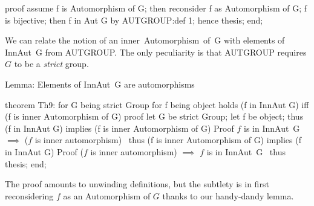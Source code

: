 \nwenddocs{}\endmoddef\nwstartdeflinemarkup{}\nwenddeflinemarkup
proof
  assume f is Automorphism of G;
  then reconsider f as Automorphism of G;
  f is bijective;
  then f in Aut G by AUTGROUP:def 1;
  hence thesis;
end;

\nwendcode{}\nwdocspar

We can relate the notion of an {\Tt{}inner\ Automorphism\ of\ G\nwendquote} with elements
of {\Tt{}InnAut\ G\nwendquote} from {\Tt{}AUTGROUP\nwendquote}. The only peculiarity is that
{\Tt{}AUTGROUP\nwendquote} requires $G$ to be a \emph{strict} group.

\nwenddocs{}\endmoddef\nwstartdeflinemarkup{}\nwenddeflinemarkup
\LA{}Lemma: Elements of \code{}InnAut\ G\edoc{} are automorphisms~{\nwtagstyle{}}\RA{}

theorem Th9:
  for G being strict Group
  for f being object
  holds (f in InnAut G) iff (f is inner Automorphism of G)
proof
  let G be strict Group;
  let f be object;
  thus (f in InnAut G) implies (f is inner Automorphism of G)
  \LA{}Proof $f$ is in \code{}InnAut\ G\edoc{} $\implies$ ($f$ is inner automorphism)~{\nwtagstyle{}}\RA{}
  thus (f is inner Automorphism of G) implies (f in InnAut G)
  \LA{}Proof ($f$ is inner automorphism) $\implies$ $f$ is in \code{}InnAut\ G\edoc{}~{\nwtagstyle{}}\RA{}
  thus thesis;
end;

\nwendcode{}\nwdocspar

 The proof amounts to unwinding
definitions, but the subtlety is in first reconsidering $f$ as an
Automorphism of $G$ thanks to our handy-dandy lemma.

